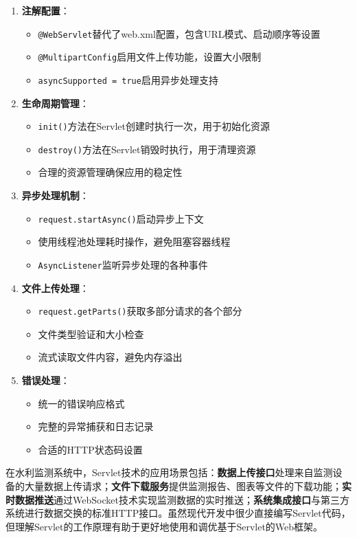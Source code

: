 \begin{enumerate} \def\labelenumi{\arabic{enumi}.} \tightlist \item \textbf{注解配置}： \begin{itemize} \tightlist \item
\texttt{@WebServlet}替代了web.xml配置，包含URL模式、启动顺序等设置 \item \texttt{@MultipartConfig}启用文件上传功能，设置大小限制 \item
\texttt{asyncSupported = true}启用异步处理支持 \end{itemize} \item \textbf{生命周期管理}： \begin{itemize} \tightlist \item
\texttt{init()}方法在Servlet创建时执行一次，用于初始化资源 \item \texttt{destroy()}方法在Servlet销毁时执行，用于清理资源 \item 合理的资源管理确保应用的稳定性
\end{itemize} \item \textbf{异步处理机制}： \begin{itemize} \tightlist \item \texttt{request.startAsync()}启动异步上下文 \item
使用线程池处理耗时操作，避免阻塞容器线程 \item \texttt{AsyncListener}监听异步处理的各种事件 \end{itemize} \item \textbf{文件上传处理}： \begin{itemize}
\tightlist \item \texttt{request.getParts()}获取多部分请求的各个部分 \item 文件类型验证和大小检查 \item 流式读取文件内容，避免内存溢出 \end{itemize} \item
\textbf{错误处理}： \begin{itemize} \tightlist \item 统一的错误响应格式 \item 完整的异常捕获和日志记录 \item 合适的HTTP状态码设置 \end{itemize}
\end{enumerate}
在水利监测系统中，Servlet技术的应用场景包括：\textbf{数据上传接口}处理来自监测设备的大量数据上传请求；\textbf{文件下载服务}提供监测报告、图表等文件的下载功能；\textbf{实时数据推送}通过WebSocket技术实现监测数据的实时推送；\textbf{系统集成接口}与第三方系统进行数据交换的标准HTTP接口。虽然现代开发中很少直接编写Servlet代码，但理解Servlet的工作原理有助于更好地使用和调优基于Servlet的Web框架。
